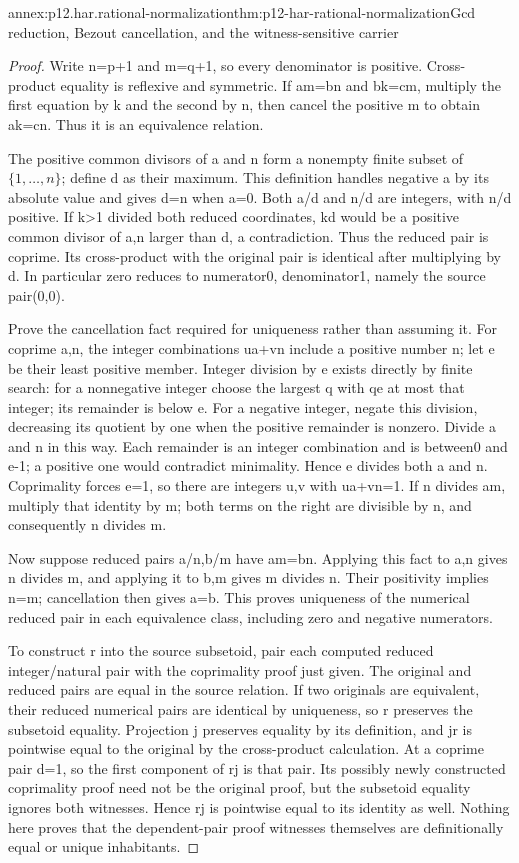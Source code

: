 \begin{annexitem}{annex:p12.har.rational-normalization}{thm:p12-har-rational-normalization}{Gcd reduction, Bezout cancellation, and the witness-sensitive carrier}
\begin{proof}
Write n=p+1 and m=q+1, so every denominator is positive. Cross-product
equality is reflexive and symmetric. If am=bn and bk=cm, multiply
the first equation by k and the second by n, then cancel the positive
m to obtain ak=cn. Thus it is an equivalence relation.

The positive common divisors of a and n form a nonempty finite subset
of \(\{1,\ldots,n\}\); define d as their maximum. This definition
handles negative a by its absolute value and gives d=n when a=0.
Both a/d and n/d are integers, with n/d positive. If k>1 divided
both reduced coordinates, kd would be a positive common divisor of
a,n larger than d, a contradiction. Thus the reduced pair is coprime.
Its cross-product with the original pair is identical after multiplying
by d. In particular zero reduces to numerator0, denominator1, namely
the source pair(0,0).

Prove the cancellation fact required for uniqueness rather than assuming
it. For coprime a,n, the integer combinations ua+vn include a positive
number n; let e be their least positive member. Integer division by e
exists directly by finite search: for a nonnegative integer choose the
largest q with qe at most that integer; its remainder is below e.
For a negative integer, negate this division, decreasing its quotient
by one when the positive remainder is nonzero. Divide a and n in
this way. Each remainder is an integer combination and is between0
and e-1; a positive one would contradict minimality. Hence e divides
both a and n. Coprimality forces e=1, so there are integers u,v with
ua+vn=1. If n divides am, multiply that identity by m; both terms
on the right are divisible by n, and consequently n divides m.

Now suppose reduced pairs a/n,b/m have am=bn. Applying this fact
to a,n gives n divides m, and applying it to b,m gives m divides n.
Their positivity implies n=m; cancellation then gives a=b. This
proves uniqueness of the numerical reduced pair in each equivalence
class, including zero and negative numerators.

To construct r into the source subsetoid, pair each computed reduced
integer/natural pair with the coprimality proof just given. The original
and reduced pairs are equal in the source relation. If two originals
are equivalent, their reduced numerical pairs are identical by uniqueness,
so r preserves the subsetoid equality. Projection j preserves equality
by its definition, and jr is pointwise equal to the original by the
cross-product calculation. At a coprime pair d=1, so the first component
of rj is that pair. Its possibly newly constructed coprimality proof
need not be the original proof, but the subsetoid equality ignores both
witnesses. Hence rj is pointwise equal to its identity as well.
Nothing here proves that the dependent-pair proof witnesses themselves
are definitionally equal or unique inhabitants.
\end{proof}
\end{annexitem}

